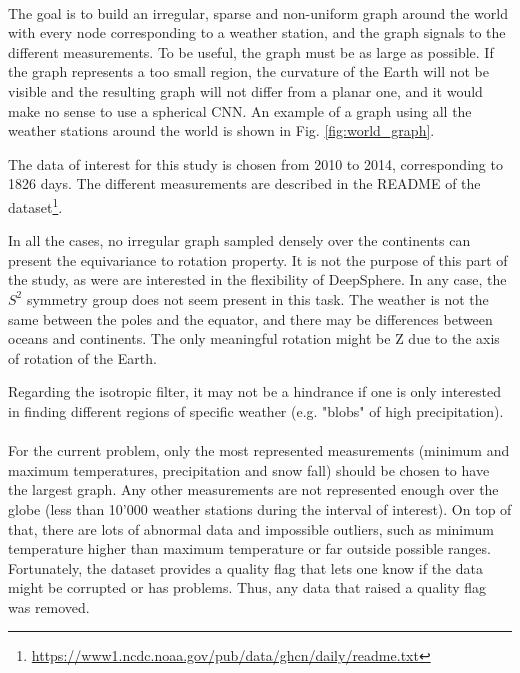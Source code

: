 \documentclass[11pt]{report}
\begin{document}
\paragraph*{}

The goal is to build an irregular, sparse and non-uniform graph around the world with every node corresponding to a weather station, and the graph signals to the different measurements. To be useful, the graph must be as large as possible. If the graph represents a too small region, the curvature of the Earth will not be visible and the resulting graph will not differ from a planar one, and it would make no sense to use a spherical CNN. An example of a graph using all the weather stations around the world is shown in Fig. \ref{fig:world_graph}.

The data of interest for this study is chosen from 2010 to 2014, corresponding to 1826 days. The different measurements are described in the README of the dataset\footnote{\url{https://www1.ncdc.noaa.gov/pub/data/ghcn/daily/readme.txt}}.

In all the cases, no irregular graph sampled densely over the continents can present the equivariance to rotation property. It is not the purpose of this part of the study, as were are interested in the flexibility of DeepSphere. In any case, the $S^2$ symmetry group does not seem present in this task. The weather is not the same between the poles and the equator, and there may be differences between oceans and continents. The only meaningful rotation might be Z due to the axis of rotation of the Earth.

Regarding the isotropic filter, it may not be a hindrance if one is only interested in finding different regions of specific weather (e.g. "blobs" of high precipitation).

\paragraph*{}
For the current problem, only the most represented measurements (minimum and maximum temperatures, precipitation and snow fall) should be chosen to have the largest graph. Any other measurements are not represented enough over the globe (less than 10'000 weather stations during the interval of interest).
On top of that, there are lots of abnormal data and impossible outliers, such as minimum temperature higher than maximum temperature or far outside possible ranges. Fortunately, the dataset provides a quality flag that lets one know if the data might be corrupted or has problems. Thus, any data that raised a quality flag was removed.
\end{document}
